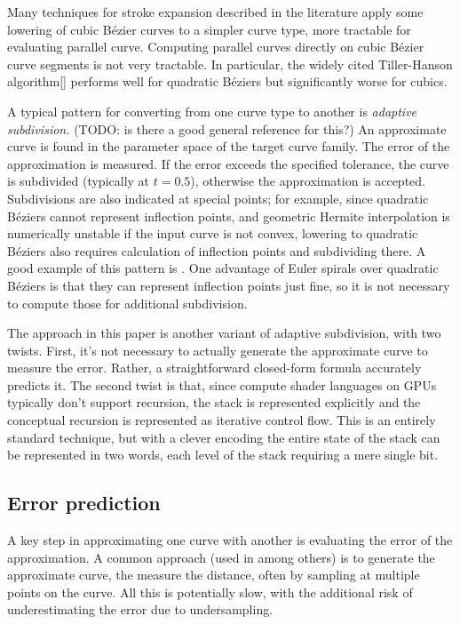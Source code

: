 \documentclass[sigconf, authordraft]{acmart}
\begin{document}
Many techniques for stroke expansion described in the literature apply some lowering of cubic Bézier curves to a simpler curve type, more tractable for evaluating parallel curve. Computing parallel curves directly on cubic Bézier curve segments is not very tractable. In particular, the widely cited Tiller-Hanson algorithm[] performs well for quadratic Béziers but significantly worse for cubics.


A typical pattern for converting from one curve type to another is \emph{adaptive subdivision.} (TODO: is there a good general reference for this?) An approximate curve is found in the parameter space of the target curve family. The error of the approximation is measured. If the error exceeds the specified tolerance, the curve is subdivided (typically at $t = 0.5$), otherwise the approximation is accepted. Subdivisions are also indicated at special points; for example, since quadratic Béziers cannot represent inflection points, and geometric Hermite interpolation is numerically unstable if the input curve is not convex, lowering to quadratic Béziers also requires calculation of inflection points and subdividing there. A good example of this pattern is \citet{Nehab2020}. One advantage of Euler spirals over quadratic Béziers is that they can represent inflection points just fine, so it is not necessary to compute those for additional subdivision.

The approach in this paper is another variant of adaptive subdivision, with two twists. First, it's not necessary to actually generate the approximate curve to measure the error. Rather, a straightforward closed-form formula accurately predicts it. The second twist is that, since compute shader languages on GPUs typically don't support recursion, the stack is represented explicitly and the conceptual recursion is represented as iterative control flow. This is an entirely standard technique, but with a clever encoding the entire state of the stack can be represented in two words, each level of the stack requiring a mere single bit.

\subsection{Error prediction}

A key step in approximating one curve with another is evaluating the error of the approximation. A common approach (used in \citet{Nehab2020} among others) is to generate the approximate curve, the measure the distance, often by sampling at multiple points on the curve. All this is potentially slow, with the additional risk of underestimating the error due to undersampling.
\end{document}
